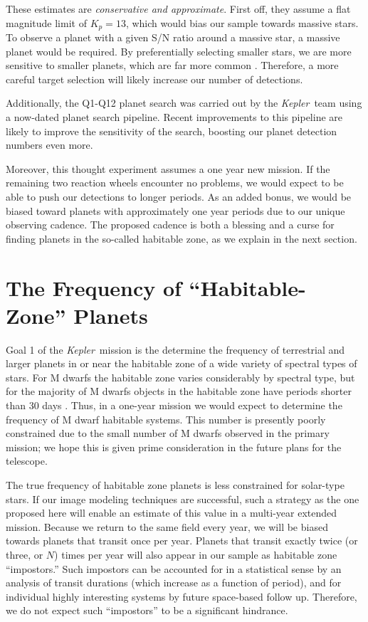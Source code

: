 \documentclass[12pt, preprint]{aastex}
\newcommand{\observatory}[1]{\textsl{#1}}
\newcommand{\kepler}{\observatory{Kepler}}
\newcommand{\Kepler}{\kepler}
\begin{document}
These estimates are \textit{conservative and approximate}. 
First off, they assume a flat magnitude limit of $K_p = 13$, which would bias 
 our sample towards massive stars. 
To observe a planet with a given S/N ratio around a massive star, a massive 
 planet would be required. 
By preferentially selecting smaller stars, we are more sensitive to smaller 
 planets, which are far more common \citep{Morton13}. 
Therefore, a more careful target selection will likely increase our 
 number of detections.

Additionally, the Q1-Q12 planet search was carried out by the \Kepler\ team 
 using a now-dated planet search pipeline. 
Recent improvements to this pipeline are likely to improve the sensitivity of 
 the search, boosting our planet detection numbers even more. 

Moreover, this thought experiment assumes a one year new mission. 
If the remaining two reaction wheels encounter no problems, we would expect 
 to be able to push our detections to longer periods. 
As an added bonus, we would be biased toward planets with approximately one
 year periods due to our unique observing cadence. 
The proposed cadence is both a blessing and a curse for finding planets in the 
 so-called habitable zone, as we explain in the next section.
 




\section{The Frequency of ``Habitable-Zone'' Planets}
\label{HZ}
Goal 1 of the \Kepler\ mission is the determine the frequency of terrestrial 
 and larger planets in or near the habitable zone of a wide variety of 
 spectral types of stars. 
For M dwarfs the habitable zone varies considerably by spectral type,
 but for the majority of M dwarfs objects in the habitable 
 zone have periods shorter than 30 days \citep{Selsis07, Kopparapu13}.
Thus, in a one-year mission we would expect to determine the frequency of 
 M dwarf habitable systems. This number is presently poorly constrained due 
 to the small number of M dwarfs observed in the primary mission; we hope
 this is given prime consideration in the future plans for the telescope.

The true frequency of habitable zone planets is less constrained for solar-type 
 stars.
If our image modeling techniques are successful, such a strategy as the 
 one proposed here will enable an estimate of this value in a multi-year 
 extended mission. 
Because we return to the same field every year, we will be biased towards 
 planets that transit once per year. 
Planets that transit exactly twice (or three, or $N$) times per year will 
 also appear in our sample as habitable zone ``impostors.'' 
Such impostors can be accounted for in a statistical sense by an analysis of 
 transit durations (which increase as a function of period), and for 
 individual highly interesting systems by future space-based follow up. 
Therefore, we do not expect such ``impostors'' to be a significant hindrance.
\end{document}
